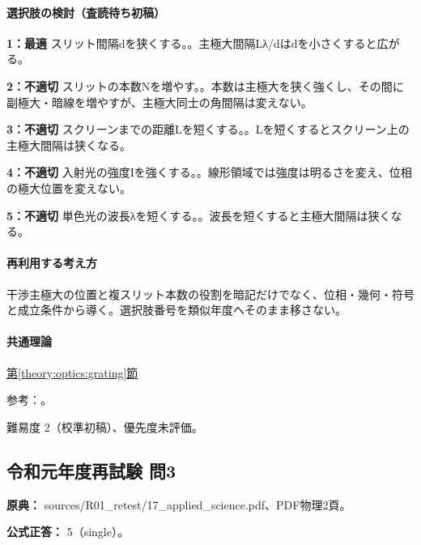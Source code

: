 \paragraph{選択肢の検討（査読待ち初稿）}\mbox{}\par

\noindent\textbf{1：最適} スリット間隔dを狭くする。。主極大間隔Lλ/dはdを小さくすると広がる。\par

\noindent\textbf{2：不適切} スリットの本数Nを増やす。。本数は主極大を狭く強くし、その間に副極大・暗線を増やすが、主極大同士の角間隔は変えない。\par

\noindent\textbf{3：不適切} スクリーンまでの距離Lを短くする。。Lを短くするとスクリーン上の主極大間隔は狭くなる。\par

\noindent\textbf{4：不適切} 入射光の強度Iを強くする。。線形領域では強度は明るさを変え、位相の極大位置を変えない。\par

\noindent\textbf{5：不適切} 単色光の波長λを短くする。。波長を短くすると主極大間隔は狭くなる。\par

\paragraph{再利用する考え方} 干渉主極大の位置と複スリット本数の役割を暗記だけでなく、位相・幾何・符号と成立条件から導く。選択肢番号を類似年度へそのまま移さない。

\paragraph{共通理論} \hyperref[theory:optics:grating]{第\ref*{theory:optics:grating}節}

\par 参考：\cite{os_grating,os_double}。

\par 難易度 2（校準初稿）、優先度未評価。

\subsection{令和元年度再試験 問3}
\label{q:r01-ret-applied-03}

\noindent\textbf{原典：} sources/R01\_retest/17\_applied\_science.pdf、PDF物理2頁。

\textbf{公式正答：} 5（single）。

